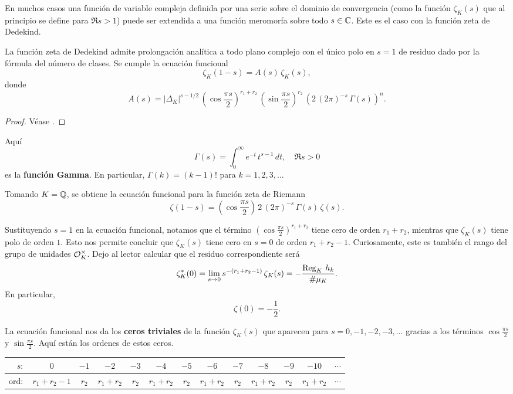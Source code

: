 En muchos casos una función de variable compleja definida por una serie sobre
el dominio de convergencia (como la función $\zeta_K (s)$ que al principio se
define para $\Re s > 1$) puede ser extendida a una función meromorfa sobre todo
$s \in \mathbb{C}$. Este es el caso con la función zeta de Dedekind.

\begin{teorema}
  La función zeta de Dedekind admite prolongación analítica a todo plano
  complejo con el único polo en $s = 1$ de residuo dado por la fórmula del
  número de clases. Se cumple la ecuación funcional
  $$\zeta_K (1-s) = A(s)\,\zeta_K (s),$$
  donde
  $$A (s) = |\Delta_K|^{s - 1/2}\,\left(\cos\frac{\pi s}{2}\right)^{r_1+r_2}\,\left(\sin\frac{\pi s}{2}\right)^{r_2}\,\left(2\,(2\pi)^{-s}\,\Gamma (s)\right)^n.$$

  \begin{proof}
    Véase \cite[\S VII.5]{Neukirch-ANT}.
  \end{proof}
\end{teorema}

Aquí
$$\Gamma (s) = \int_0^\infty e^{-t}\,t^{s-1}\,dt, \quad \Re s > 0$$
es la \textbf{función Gamma}. En particular, $\Gamma (k) = (k-1)!$ para $k = 1,2,3,\ldots$

Tomando $K = \mathbb{Q}$, se obtiene la ecuación funcional para la función zeta de
Riemann
$$\zeta (1-s) = \left(\cos\frac{\pi s}{2}\right)\,2\,(2\pi)^{-s}\,\Gamma (s)\,\zeta (s).$$

Sustituyendo $s = 1$ en la ecuación funcional, notamos que el término
$\left(\cos\frac{\pi s}{2}\right)^{r_1+r_2}$ tiene cero de orden $r_1 + r_2$,
mientras que $\zeta_K (s)$ tiene polo de orden $1$. Esto nos permite concluir
que $\zeta_K (s)$ tiene cero en $s = 0$ de orden $r_1 + r_2 - 1$. Curiosamente,
este es también el rango del grupo de unidades $\mathcal{O}_K^\times$. Dejo al lector
calcular que el residuo correspondiente será
$$\zeta_K^* (0) = \lim_{s \to 0} s^{-(r_1 + r_2 - 1)}\,\zeta_K (s) = -\frac{\operatorname{Reg}_K\,h_k}{\# \mu_K}.$$
En particular,
$$\zeta (0) = -\frac{1}{2}.$$

La ecuación funcional nos da los \textbf{ceros triviales} de la función
$\zeta_K (s)$ que aparecen para $s = 0,-1,-2,-3,\ldots$ gracias a los términos
$\cos \frac{\pi s}{2}$ y $\sin \frac{\pi s}{2}$. Aquí están los ordenes de estos
ceros.

\begin{center}
  \renewcommand{\arraystretch}{1.5}
  \begin{tabular}{rcccccccccccc}
    \hline
    $s\colon$ & $0$ & $-1$ & $-2$ & $-3$ & $-4$ & $-5$ & $-6$ & $-7$ & $-8$ & $-9$ & $-10$ & $\cdots$ \\
    \hline
    $\text{ord}\colon$ & $r_1 + r_2 - 1$ & $r_2$ & $r_1 + r_2$ & $r_2$ & $r_1 + r_2$ & $r_2$ & $r_1 + r_2$ & $r_2$ & $r_1 + r_2$ & $r_2$ & $r_1 + r_2$ & $\cdots$ \\
    \hline
  \end{tabular}
\end{center}

